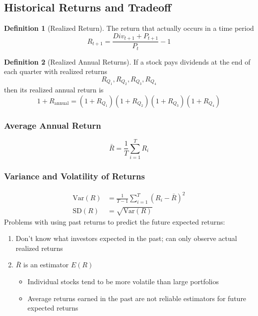 \documentclass[11pt]{article}
\theoremstyle{definition}
\newtheorem*{definition}{Definition}
\newcommand{\Var}{\text{Var}}
\newcommand{\Sd}{\text{SD}}
\begin{document}
\subsection{Historical Returns and Tradeoff}
\begin{definition}[Realized Return]
    The return that actually occurs in a time period
    \begin{equation*}
        R_{t +1 } = \frac{Div_{t + 1} + P_{t + 1}}{P_t} -1
    \end{equation*}
\end{definition}
\begin{definition}[Realized Annual Returns]
    If a stock pays dividends at the end of each quarter with realized returns 
    \begin{equation*}
        R_{Q_1}, R_{Q_2}, R_{Q_3}, R_{Q_4}
    \end{equation*}
    then its realized annual return is 
    \begin{equation*}
        1 + R_{\text{annual}} = (1 + R_{Q_1}) (1 + R_{Q_2}) (1 + R_{Q_3}) (1 + R_{Q_4})
    \end{equation*}
\end{definition}

\subsubsection{Average Annual Return}
\begin{equation*}
    \bar R  = \frac{1}{T}\sum_{i=1}^T R_i  
\end{equation*}

\subsubsection{Variance and Volatility of Returns}
\begin{align*}
    \Var(R) &= \frac{1}{T-1} \sum_{i=1}^T (R_i - \bar R)^2\\
    \Sd(R) &= \sqrt{\Var(R)}
\end{align*}
Problems with using past returns to predict the future expected returns:
\begin{enumerate}
    \item Don't know what investors expected in the past; can only observe actual realized returns
    \item $\bar R$ is an estimator $E(R)$
    \begin{itemize}
        \item Individual stocks tend to be more volatile than large portfolios
        \item Average returns earned in the past are not reliable estimators for future expected returns
    \end{itemize}
\end{enumerate}
\end{document}
